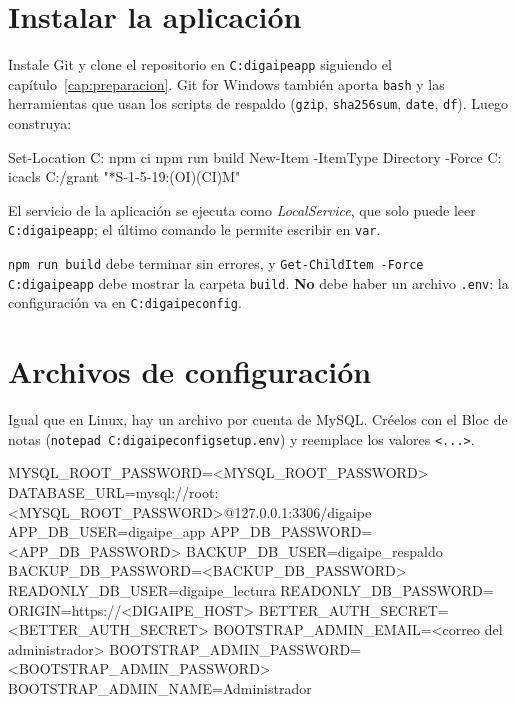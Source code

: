 \section{Instalar la aplicación}

Instale Git y clone el repositorio en \texttt{C:\bs digaipe\bs app} siguiendo el
capítulo~\ref{cap:preparacion}. Git for Windows también aporta \texttt{bash} y las herramientas
que usan los scripts de respaldo (\texttt{gzip}, \texttt{sha256sum}, \texttt{date},
\texttt{df}). Luego construya:

\begin{codigo}
Set-Location C:\digaipe\app
npm ci
npm run build
New-Item -ItemType Directory -Force C:\digaipe\app\var\uploads
icacls C:\digaipe\app\var /grant "*S-1-5-19:(OI)(CI)M"
\end{codigo}

El servicio de la aplicación se ejecuta como \emph{LocalService}, que solo puede leer
\texttt{C:\bs digaipe\bs app}; el último comando le permite escribir en \texttt{var}.

\begin{comprobar}
	\texttt{npm run build} debe terminar sin errores, y \texttt{Get-ChildItem -Force
	C:\bs digaipe\bs app} debe mostrar la carpeta \texttt{build}. \textbf{No} debe haber un
	archivo \texttt{.env}: la configuración va en \texttt{C:\bs digaipe\bs config}.
\end{comprobar}

\section{Archivos de configuración}
\label{sec:win-config}

Igual que en Linux, hay un archivo por cuenta de MySQL. Créelos con el Bloc de notas
(\texttt{notepad C:\bs digaipe\bs config\bs setup.env}) y reemplace los valores \texttt{<...>}.

\begin{codigo}[label={C:\textbackslash digaipe\textbackslash config\textbackslash setup.env  (instalación, restauración y auditoría: root de MySQL)}]
MYSQL_ROOT_PASSWORD=<MYSQL_ROOT_PASSWORD>
DATABASE_URL=mysql://root:<MYSQL_ROOT_PASSWORD>@127.0.0.1:3306/digaipe
APP_DB_USER=digaipe_app
APP_DB_PASSWORD=<APP_DB_PASSWORD>
BACKUP_DB_USER=digaipe_respaldo
BACKUP_DB_PASSWORD=<BACKUP_DB_PASSWORD>
READONLY_DB_USER=digaipe_lectura
READONLY_DB_PASSWORD=
ORIGIN=https://<DIGAIPE_HOST>
BETTER_AUTH_SECRET=<BETTER_AUTH_SECRET>
BOOTSTRAP_ADMIN_EMAIL=<correo del administrador>
BOOTSTRAP_ADMIN_PASSWORD=<BOOTSTRAP_ADMIN_PASSWORD>
BOOTSTRAP_ADMIN_NAME=Administrador
\end{codigo}

